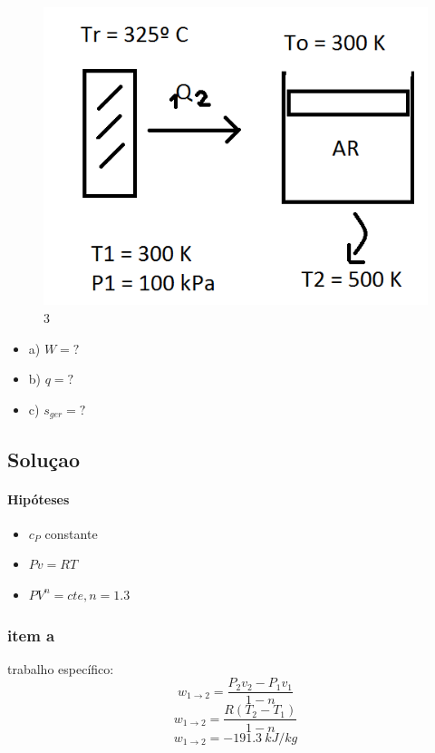 \documentclass[a4paper, 12pt]{article}
\begin{document}
\begin{figure}[h]
\begin{center}
\includegraphics[scale=0.58]{./fig/3.png}
\caption{\label{fig:3}3} 
\end{center}
\end{figure}
\begin{itemize}
\item	a) $W=?$
\item	b) $q=?$
\item	c) $s_{ger}=?$

\end{itemize}

\subsection*{Soluçao}

\paragraph*{Hipóteses}
\begin{itemize}
\item $c_{P}$ constante
\item $Pv = RT$
\item $PV^{n}=cte, n = 1.3$
\end{itemize}

\subsubsection*{item a}
trabalho específico:
\[w _{1 \rightarrow 2}= \frac{P_{2}v_{2}-P_{1}v_{1}}{1-n}\]
\[w _{1 \rightarrow 2}= \frac{R(T_{2}-T_{1})}{1-n}\]
\[w _{1 \rightarrow 2}= -191.3 \ kJ/kg\]
\end{document}
